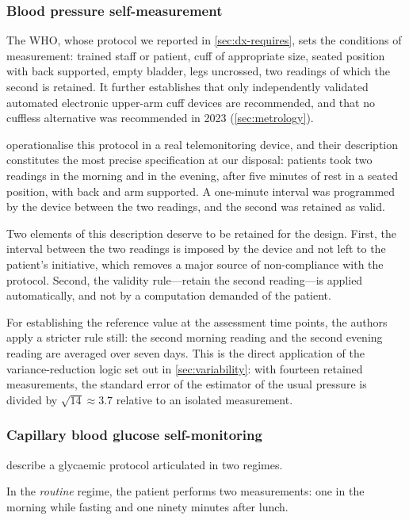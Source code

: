 \documentclass[12pt,a4paper,oneside]{report}
\begin{document}
\subsubsection{Blood pressure self-measurement}

The WHO, whose protocol we reported in \cref{sec:dx-requires}, sets the conditions of measurement: trained staff or patient, cuff of appropriate size, seated position with back supported, empty bladder, legs uncrossed, two readings of which the second is retained. It further establishes that only independently validated automated electronic upper-arm cuff devices are recommended, and that no cuffless alternative was recommended in 2023 (\cref{sec:metrology}).

\textcite{mihevc2025} operationalise this protocol in a real telemonitoring device, and their description constitutes the most precise specification at our disposal: patients took two readings in the morning and in the evening, after five minutes of rest in a seated position, with back and arm supported. A one-minute interval was programmed by the device between the two readings, and the second was retained as valid.

Two elements of this description deserve to be retained for the design. First, the interval between the two readings is imposed by the device and not left to the patient's initiative, which removes a major source of non-compliance with the protocol. Second, the validity rule---retain the second reading---is applied automatically, and not by a computation demanded of the patient.

For establishing the reference value at the assessment time points, the authors apply a stricter rule still: the second morning reading and the second evening reading are averaged over seven days. This is the direct application of the variance-reduction logic set out in \cref{sec:variability}: with fourteen retained measurements, the standard error of the estimator of the usual pressure is divided by $\sqrt{14} \approx 3.7$ relative to an isolated measurement.

\subsubsection{Capillary blood glucose self-monitoring}

\textcite{mihevc2025} describe a glycaemic protocol articulated in two regimes.

In the \emph{routine} regime, the patient performs two measurements: one in the morning while fasting and one ninety minutes after lunch.
\end{document}
